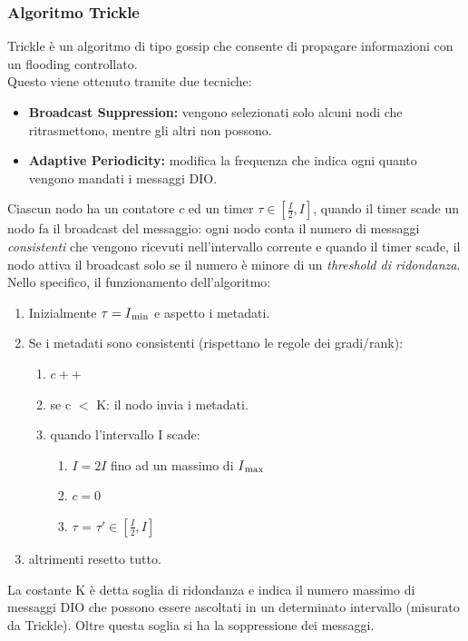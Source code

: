 \documentclass{article}
\begin{document}
\subsubsection{Algoritmo Trickle}
Trickle è un algoritmo di tipo gossip che consente di propagare informazioni con un flooding controllato. \\ Questo viene ottenuto tramite due tecniche:
\begin{itemize}
    \item \textbf{Broadcast Suppression:} vengono selezionati solo alcuni nodi che ritrasmettono, mentre gli altri non possono.
    \item \textbf{Adaptive Periodicity:} modifica la frequenza che indica ogni quanto vengono mandati i messaggi DIO.
\end{itemize}
Ciascun nodo ha un contatore \(\displaystyle c\) ed un timer \(\displaystyle\tau \in [\frac{I}{2}, I]\), quando il timer scade un nodo fa il broadcast del messaggio: ogni nodo conta il numero di messaggi \textit{consistenti} che vengono ricevuti nell'intervallo corrente e quando il timer scade, il nodo attiva il broadcast solo se il numero è minore di un \textit{threshold di ridondanza}. \\ Nello specifico, il funzionamento dell'algoritmo:
\begin{enumerate}
    \item Inizialmente \(\displaystyle \tau = I\textsubscript{min}\) e aspetto i metadati.
    \item Se i metadati sono consistenti (rispettano le regole dei gradi/rank):
    \begin{enumerate}
        \item \(\displaystyle c++\)
        \item se c $<$ K: il nodo invia i metadati.
        \item quando l'intervallo I scade:
        \begin{enumerate}
            \item \(\displaystyle I = 2I\) fino ad un massimo di \(\displaystyle I\textsubscript{max}\)
            \item \(\displaystyle c=0\)
            \item \(\displaystyle \tau\) = \(\displaystyle \tau' \in [\frac{I}{2}, I]\)
        \end{enumerate}
    \end{enumerate}
    \item altrimenti resetto tutto.
\end{enumerate}
La costante K è detta soglia di ridondanza e indica il numero massimo di messaggi DIO che possono essere ascoltati in un determinato intervallo (misurato da Trickle). Oltre questa soglia si ha la soppressione dei messaggi. \\
\end{document}

